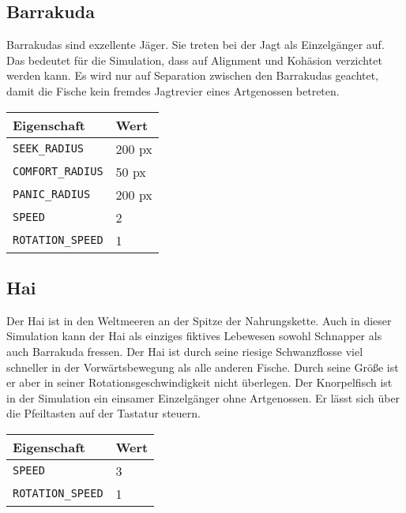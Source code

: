 \documentclass[11pt]{article}
\begin{document}
\subsection{Barrakuda}
Barrakudas sind exzellente Jäger. Sie treten bei der Jagt als Einzelgänger auf. Das bedeutet für die Simulation, dass auf Alignment und Kohäsion verzichtet werden kann. Es wird nur auf Separation zwischen den Barrakudas geachtet, damit die Fische kein fremdes Jagtrevier eines Artgenossen betreten.\\

\begin{tabular}{|l|l|}
\hline
	\textbf{Eigenschaft} & \textbf{Wert}\\
\hline
\hline
	\lstinline[]$SEEK_RADIUS$  & 200 px\\
\hline
	\lstinline[]$COMFORT_RADIUS$ & 50 px\\
\hline
	\lstinline[]$PANIC_RADIUS$ & 200 px\\
\hline
	\lstinline[]$SPEED$ & 2\\
\hline
	\lstinline[]$ROTATION_SPEED$ & 1\\
\hline
\end{tabular}

\subsection{Hai}
Der Hai ist in den Weltmeeren an der Spitze der Nahrungskette. Auch in dieser Simulation kann der Hai als einziges fiktives Lebewesen sowohl Schnapper als auch Barrakuda fressen. Der Hai ist durch seine riesige Schwanzflosse viel schneller in der Vorwärtsbewegung als alle anderen Fische. Durch seine Größe ist er aber in seiner Rotationsgeschwindigkeit nicht überlegen. Der Knorpelfisch ist in der Simulation ein einsamer Einzelgänger ohne Artgenossen. Er lässt sich über die Pfeiltasten auf der Tastatur steuern.\\

\begin{tabular}{|l|l|}
\hline
	\textbf{Eigenschaft} & \textbf{Wert}\\
\hline
\hline
	\lstinline[]$SPEED$ & 3\\
\hline
	\lstinline[]$ROTATION_SPEED$ & 1\\
\hline
\end{tabular}
\end{document}

